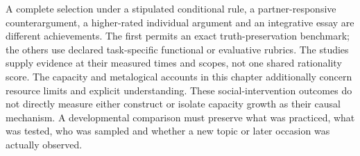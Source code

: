 A complete selection under a stipulated conditional rule, a partner-responsive
counterargument, a higher-rated individual argument and an integrative essay
are different achievements. The first permits an exact truth-preservation
benchmark; the others use declared task-specific functional or evaluative
rubrics. The studies supply evidence at their measured times and scopes,
not one shared rationality score. The capacity and metalogical accounts in
this chapter additionally concern resource limits and explicit understanding.
These social-intervention outcomes do not directly measure either construct
or isolate capacity growth as their causal mechanism. A developmental
comparison must preserve what was practiced, what was tested, who was
sampled and whether a new topic or later occasion was actually observed.

